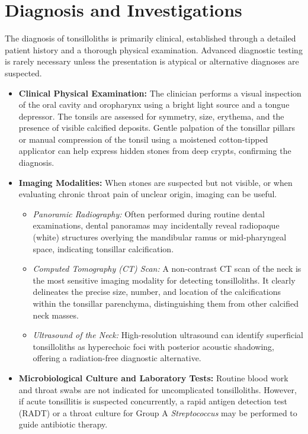 \section*{Diagnosis and Investigations}
The diagnosis of tonsilloliths is primarily clinical, established through a detailed patient history and a thorough physical examination. Advanced diagnostic testing is rarely necessary unless the presentation is atypical or alternative diagnoses are suspected.
\begin{itemize}
    \item \textbf{Clinical Physical Examination:} The clinician performs a visual inspection of the oral cavity and oropharynx using a bright light source and a tongue depressor. The tonsils are assessed for symmetry, size, erythema, and the presence of visible calcified deposits. Gentle palpation of the tonsillar pillars or manual compression of the tonsil using a moistened cotton-tipped applicator can help express hidden stones from deep crypts, confirming the diagnosis.
    \item \textbf{Imaging Modalities:} When stones are suspected but not visible, or when evaluating chronic throat pain of unclear origin, imaging can be useful.
    \begin{itemize}
        \item \textit{Panoramic Radiography:} Often performed during routine dental examinations, dental panoramas may incidentally reveal radiopaque (white) structures overlying the mandibular ramus or mid-pharyngeal space, indicating tonsillar calcification.
        \item \textit{Computed Tomography (CT) Scan:} A non-contrast CT scan of the neck is the most sensitive imaging modality for detecting tonsilloliths. It clearly delineates the precise size, number, and location of the calcifications within the tonsillar parenchyma, distinguishing them from other calcified neck masses.
        \item \textit{Ultrasound of the Neck:} High-resolution ultrasound can identify superficial tonsilloliths as hyperechoic foci with posterior acoustic shadowing, offering a radiation-free diagnostic alternative.
    \end{itemize}
    \item \textbf{Microbiological Culture and Laboratory Tests:} Routine blood work and throat swabs are not indicated for uncomplicated tonsilloliths. However, if acute tonsillitis is suspected concurrently, a rapid antigen detection test (RADT) or a throat culture for Group A \textit{Streptococcus} may be performed to guide antibiotic therapy.
\end{itemize}

